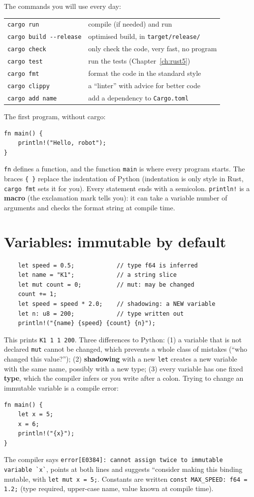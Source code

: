 The commands you will use every day:
\begin{center}
\renewcommand{\arraystretch}{1.2}
\begin{tabular}{ll}
\verb!cargo run! & compile (if needed) and run\\
\verb!cargo build --release! & optimised build, in \verb!target/release/!\\
\verb!cargo check! & only check the code, very fast, no program\\
\verb!cargo test! & run the tests (Chapter~\ref{ch:rust5})\\
\verb!cargo fmt! & format the code in the standard style\\
\verb!cargo clippy! & a ``linter'' with advice for better code\\
\verb!cargo add name! & add a dependency to \verb!Cargo.toml!\\
\end{tabular}
\end{center}
The first program, without cargo:
\begin{verbatim}
fn main() {
    println!("Hello, robot");
}
\end{verbatim}
\verb!fn! defines a function, and the function \verb!main! is where every program starts. The braces \verb!{ }! replace the indentation of Python (indentation is only style in Rust, \verb!cargo fmt! sets it for you). Every statement ends with a semicolon. \verb|println!| is a \textbf{macro} (the exclamation mark tells you): it can take a variable number of arguments and checks the format string at compile time.

\section*{Variables: immutable by default}
\begin{verbatim}
    let speed = 0.5;            // type f64 is inferred
    let name = "K1";            // a string slice
    let mut count = 0;          // mut: may be changed
    count += 1;
    let speed = speed * 2.0;    // shadowing: a NEW variable
    let n: u8 = 200;            // type written out
    println!("{name} {speed} {count} {n}");
\end{verbatim}
This prints \verb!K1 1 1 200!. Three differences to Python: (1) a variable that is not declared \verb!mut! cannot be changed, which prevents a whole class of mistakes (``who changed this value?''); (2) \textbf{shadowing} with a new \verb!let! creates a new variable with the same name, possibly with a new type; (3) every variable has one fixed \textbf{type}, which the compiler infers or you write after a colon. Trying to change an immutable variable is a compile error:
\begin{verbatim}
fn main() {
    let x = 5;
    x = 6;
    println!("{x}");
}
\end{verbatim}
The compiler says \verb!error[E0384]: cannot assign twice to immutable variable `x`!, points at both lines and suggests ``consider making this binding mutable, with \verb!let mut x = 5;!. Constants are written \verb!const MAX_SPEED: f64 = 1.2;! (type required, upper-case name, value known at compile time).

